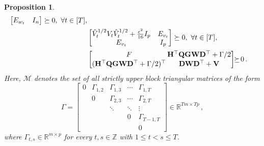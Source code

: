 \documentclass[10pt,a4paper]{amsart}
\newtheorem{proposition}{Proposition}
\begin{document}
\begin{proposition}
\begin{align*}
\begin{bmatrix}
E_{w_t} & I_n
\end{bmatrix} \succeq 0,\ \forall t \in [T],
\\[1pt]
& 
\begin{bmatrix}
\hat{V}_t^{1/2} V_t \hat{V}_t^{1/2}  +\frac{\epsilon^2}{16}I_p& E_{v_t} \\
E_{v_t} & I_p
\end{bmatrix} \succeq 0, 
\ \forall t \in [T],
\\[1pt]
& 
\setlength\arraycolsep{.9pt}
\begin{bmatrix}
F & \mathbf{H^{\top} Q G W D^{\top}} + \Gamma/2
\\[1pt]
(\mathbf{H^{\top} Q G W D^{\top}} + \Gamma/2)^{\top} & \mathbf{D W D^{\top} + V}
\end{bmatrix}
\!\!\succeq\! 0\,.
\end{align*}
\noindent
Here, $\mathcal{M}$ denotes the set of all strictly upper block triangular matrices of the form
\[
\Gamma = \begin{bmatrix}
0 & \Gamma_{1,2} & \Gamma_{1,3} & \cdots & \Gamma_{1,T} \\
 & 0 & \Gamma_{2,3} & \cdots & \Gamma_{2,T} \\
 &  & \ddots & \ddots & \vdots \\
&  &  & 0 & \Gamma_{T-1,T} \\
 & &&& 0
\end{bmatrix}
\in \mathbb{R}^{Tm \times Tp}\,,
\]
where $\Gamma_{t,s} \in \mathbb{R}^{m \times p}$ for every $t,s \in \mathbb{Z}$ with $1 \le t < s \le T$.
\end{proposition}
\end{document}
